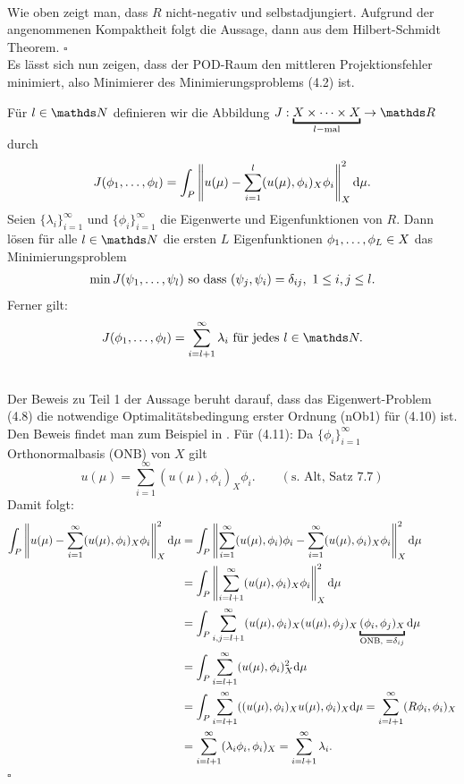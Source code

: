 \\
Wie oben zeigt man, dass $R$ nicht-negativ und selbstadjungiert. 
Aufgrund der angenommenen Kompaktheit folgt die Aussage, dann aus dem Hilbert-Schmidt Theorem.
\hfill $\square$\\

Es lässt sich nun zeigen, dass der POD-Raum den mittleren Projektionsfehler minimiert, also Minimierer des Minimierungsproblems (4.2) ist.

Für $l\in\N$ definieren wir die Abbildung $J: \underbracket{X\dt{\times} X}_{l-\text{mal}}\to \R$ durch
\begin{align}
J(\phi_1, \dots ,\phi_l) = \int_P \left\Vert u(\mu)-\sum_{i=1}^{l} (u(\mu),\phi_i)_X \phi_i\right\Vert_X^2\mathrm{d} \mu.
\end{align}
Seien $\{\lambda_i\}_{i=1}^\infty$ und $\{\phi_i\}_{i=1}^\infty$ die Eigenwerte und Eigenfunktionen von $R$.
Dann lösen für alle $l\in \N$ die ersten $L$ Eigenfunktionen $\phi_1, \dots ,\phi_L\in X$ das Minimierungsproblem
\begin{align}
\min J(\psi_1, \dots ,\psi_l) \text{ so dass } (\psi_j,\psi_i) = \delta_{ij},~1\le i,j\le l.
\end{align}
Ferner gilt:
\begin{align}
J(\phi_1\dt{,}\phi_l) = \sum_{i=l+1}^{\infty} \lambda_i \text{ für jedes } l\in \N.
\end{align}

\\
Der Beweis zu Teil 1 der Aussage beruht darauf, dass das Eigenwert-Problem (4.8) die notwendige Optimalitätsbedingung erster Ordnung (nOb1) für (4.10) ist.
Den Beweis findet man zum Beispiel in \cite{HoLuBeRo12}.
Für (4.11):
Da $\{\phi_i\}_{i=1}^\infty$ Orthonormalbasis (ONB) von $X$ gilt
\[
u(\mu) = \sum_{i=1}^{\infty} (u(\mu),\phi_i)_X\phi_i. \qquad(\text{s. Alt, Satz 7.7})
\]
Damit folgt:
\begin{align*}
\int_P \norm{u(\mu)-\sum_{i=1}^{\infty} (u(\mu),\phi_i)_X\phi_i }_X^2\dint \mu &= \int_P \norm{\sum_{i=1}^{\infty}(u(\mu),\phi_i)\phi_i - \sum_{i=1}^{\infty} (u(\mu),\phi_i)_X\phi_i }_X^2\dint \mu\\
&= \int_P \norm{\sum_{i=l+1}^{\infty} (u(\mu),\phi_i)_X\phi_i }_X^2\dint \mu\\
&= \int_P \sum_{i,j=l+1}^{\infty} (u(\mu),\phi_i)_X (u(\mu),\phi_j)_X \underbracket{(\phi_i,\phi_j)_X}_{\text{ONB, }=\delta_{ij}}\dint \mu\\
&= \int_P \sum_{i=l+1}^{\infty} (u(\mu),\phi_i)_X^2\dint \mu \\
&= \int_P \sum_{i=l+1}^{\infty} ((u(\mu),\phi_i)_X u(\mu),\phi_i)_X \dint \mu = \sum_{i=l+1}^{\infty} (R\phi_i,\phi_i)_X \\
&= \sum_{i=l+1}^{\infty} (\lambda_i\phi_i,\phi_i)_X = \sum_{i=l+1}^{\infty} \lambda_i.
\end{align*}
\hfill $\square$

